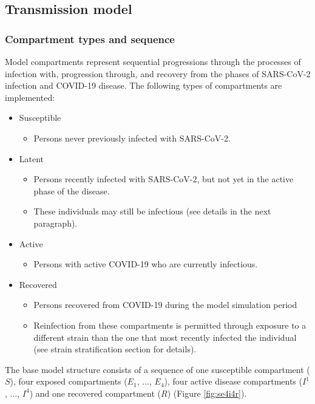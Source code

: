 
\subsection{Transmission model}
\label{trans} 
\subsubsection{Compartment types and sequence}
Model compartments represent sequential progressions through the processes of 
infection with, progression through, and recovery from the phases of SARS-CoV-2
infection and COVID-19 disease. The following types of compartments are implemented:
\begin{itemize}
    \item Susceptible
    \begin{itemize}
        \item Persons never previously infected with SARS-CoV-2.
    \end{itemize}
    \item Latent
    \begin{itemize}
        \item Persons recently infected with SARS-CoV-2, but not yet in the active phase of the disease.
        \item These individuals may still be infectious (see details in the next paragraph).
    \end{itemize}
    \item Active
    \begin{itemize}
        \item Persons with active COVID-19 who are currently infectious.
    \end{itemize}
    \item Recovered
    \begin{itemize}
        \item Persons recovered from COVID-19 during the model simulation period       
        \item Reinfection from these compartments is permitted through exposure to a different
        strain than the one that most recently infected the individual (see strain stratification section for details).
    \end{itemize}
\end{itemize}
The base model structure consists of a sequence of one susceptible compartment ($S$), four exposed compartments ($E_1$, ..., $E_4$), four active disease compartments ($I^1$, ..., $I^4$) and one recovered compartment ($R$) (Figure \ref{fig:se4i4r}).

